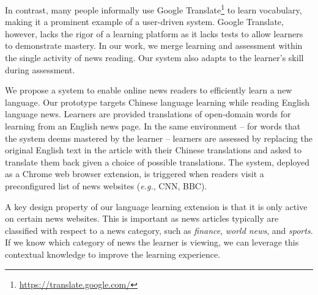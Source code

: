 In contrast, many people informally use Google
Translate\footnote{\url{https://translate.google.com/}} to learn
vocabulary, making it a prominent example of a user-driven system.
Google Translate, however, lacks the rigor of a learning platform as it lacks
tests to allow learners to demonstrate mastery.  In our work, we merge
learning and assessment within the single activity of news reading.
Our system also adapts to the learner's skill during assessment.

We propose a system to enable online news readers to efficiently learn
a new language.  Our prototype targets Chinese language learning while
reading English language news. Learners are provided translations of
open-domain words for learning from an English news page. In the same
environment -- for words that the system deems mastered by the learner
-- learners are assessed by replacing the original English text in the
article with their Chinese translations and asked to translate them
back given a choice of possible translations.  The system, deployed as
a Chrome web browser extension, is triggered when readers visit a
preconfigured list of news websites ({\it e.g.}, CNN, BBC).

A key design property of our language learning extension is that it is only
active on certain news websites.  This is important as news articles
typically are classified with respect to a news category, such as {\it
  finance}, {\it world news}, and {\it sports}. If we know which
category of news the learner is viewing, we can leverage this
contextual knowledge to improve the learning experience.

